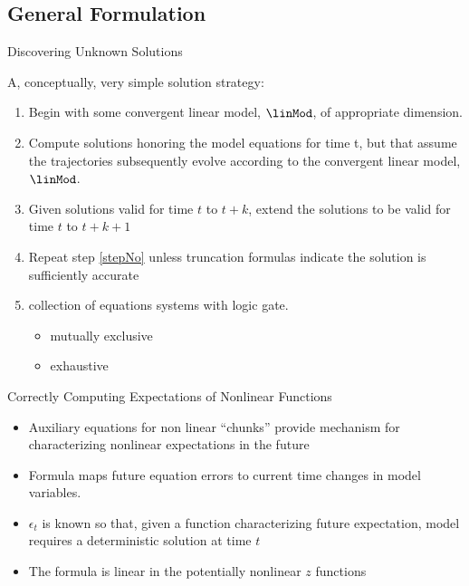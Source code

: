 \documentclass[12pt]{article}
\begin{document}
\subsection{General Formulation}
\label{sec:genAux}
  {Discovering Unknown Solutions}

A, conceptually, very simple solution strategy:  

  \begin{enumerate}
  \item Begin with some convergent linear model, $\linMod$, of appropriate dimension.
  \item Compute solutions honoring the model equations for time t, 
but that assume the trajectories subsequently 
evolve according to the convergent 
linear model, $\linMod$.
  \item Given solutions valid for time $t$ to $t+k$, extend the solutions to be valid for time $t$ to $t+k+1$ \label{stepNo}
\item Repeat step \ref{stepNo} unless truncation formulas indicate the solution is sufficiently accurate
\item collection of equations systems with logic gate.
  \begin{itemize}
  \item mutually exclusive
  \item exhaustive
  \end{itemize}
  \end{enumerate}










  {Correctly Computing Expectations of Nonlinear Functions}

  \begin{itemize}
\item Auxiliary equations for non linear ``chunks'' provide mechanism for characterizing  nonlinear expectations in the future
  \item Formula maps future equation errors  to current time changes in model
variables.
\item  $\epsilon_t$ is known so that,
given a function characterizing future expectation,  model requires
a deterministic solution at time $t$
\item The formula is linear in the potentially nonlinear $z$ functions
  \end{itemize}
\end{document}
